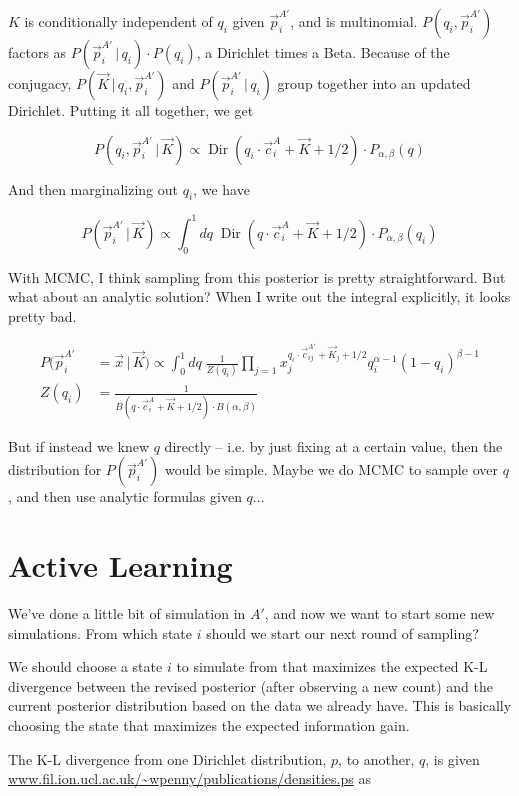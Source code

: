 \documentclass[twocolumn,floatfix,nofootinbib,aps]{revtex4-1}
\renewcommand{\vert}{\, | \,}
\begin{document}
$K$ is conditionally independent of $q_i$ given $\vec{p}_i^{A'}$, and is multinomial. $P(q_i, \vec{p}_i^{A'})$ factors as $P(\vec{p}_i^{A'} \vert q_i) \cdot  P(q_i)$, a Dirichlet times a Beta. Because of the conjugacy, $P(\vec{K} \vert q_i, \vec{p}_i^{A'})$ and $P(\vec{p}_i^{A'} \vert q_i)$ group together into an updated Dirichlet. Putting it all together, we get

$$
P(q_i, \vec{p}_i^{A'} \vert \vec{K}) \propto \operatorname{Dir}(q_i \cdot \vec{c}_i^{A} + \vec{K} + 1/2) \cdot P_{\alpha, \beta}(q)
$$

And then marginalizing out $q_i$, we have


$$
P(\vec{p}_i^{A'} \vert \vec{K}) \propto \int_0^1 dq \; \operatorname{Dir}(q \cdot \vec{c}_i^{A} + \vec{K} + 1/2) \cdot  P_{\alpha, \beta}(q_i)
$$

With MCMC, I think sampling from this posterior is pretty straightforward. But what about an analytic solution? When I write out the integral explicitly, it looks pretty bad.

\begin{align*}
P(\vec{p}_i^{A'} &= \vec{x} \vert \vec{K}) \propto \int_0^1 dq \; \frac{1}{Z(q_i)} \prod_{j=1} x_j^{q_i \cdot \vec{c}_{ij}^{A'} + \vec{K}_j + 1/2} q_i^{\alpha-1}(1-q_i)^{\beta-1}\\
Z(q_i) &= \frac{1}{B(q \cdot \vec{c}_i^{A} + \vec{K} + 1/2) \cdot B(\alpha, \beta)}
\end{align*} 

But if instead we knew $q$ directly -- i.e. by just fixing at a certain value, then the distribution for $P(\vec{p}_i^{A'})$ would be simple. Maybe we do MCMC to sample over $q$, and then use analytic formulas given $q$...

\section{Active Learning}
We've done a little bit of simulation in $A'$, and now we want to start some new simulations. From which state $i$ should we start our next round of sampling?

We should choose a state $i$ to simulate from that maximizes the expected K-L divergence between the revised posterior (after observing a new count) and the current posterior distribution based on the data we already have. This is basically choosing the state that maximizes the expected information gain.

The K-L divergence from one Dirichlet distribution, $p$, to another, $q$, is given \url{www.fil.ion.ucl.ac.uk/~wpenny/publications/densities.ps} as
\end{document}
